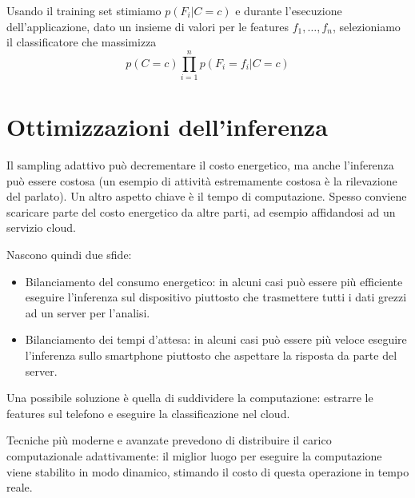 Usando il training set stimiamo $p(F_i|C=c)$ e durante l'esecuzione
dell'applicazione, dato un insieme di valori per le features $f_1, \ldots, f_n$,
selezioniamo il classificatore che massimizza
\begin{equation}
p(C=c)\prod_{i=1}^{n}p(F_i=f_i|C=c)
\end{equation}

\section{Ottimizzazioni dell'inferenza}

Il sampling adattivo può decrementare il costo energetico, ma anche l'inferenza
può essere costosa (un esempio di attività estremamente costosa è la
rilevazione del parlato). Un altro aspetto chiave è il tempo di computazione.
Spesso conviene scaricare parte del costo energetico da altre parti, ad esempio
affidandosi ad un servizio cloud.

Nascono quindi due sfide:
\begin{itemize}
        \item Bilanciamento del consumo energetico: in alcuni casi può essere
più efficiente eseguire l'inferenza sul dispositivo piuttosto che trasmettere
tutti i dati grezzi ad un server per l'analisi.
        \item Bilanciamento dei tempi d'attesa: in alcuni casi può essere più
veloce eseguire l'inferenza sullo smartphone piuttosto che aspettare la risposta
da parte del server.
\end{itemize}

Una possibile soluzione è quella di suddividere la computazione: estrarre le
features sul telefono e eseguire la classificazione nel cloud.

Tecniche più moderne e avanzate prevedono di distribuire il carico
computazionale adattivamente: il miglior luogo per eseguire la computazione
viene stabilito in modo dinamico, stimando il costo di questa operazione in
tempo reale.
